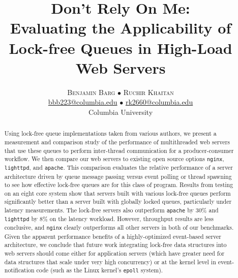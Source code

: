 \documentclass[twoside,10pt]{article}
\title{\vspace{-15mm}%
  \fontsize{24pt}{10pt}\selectfont \textbf{Don't Rely On Me:}\\
  \textbf{Evaluating the Applicability of Lock-free Queues in High-Load Web
    Servers} }
\author{%
  \large
  \textsc{Benjamin Barg $\bullet$ Ruchir Khaitan}\\[2mm]
  \normalsize \href{mailto:bbb2123@columbia.edu}{bbb223@columbia.edu}
    $\bullet$ \href{mailto:rk2660@columbia.edu}{rk2660@columbia.edu}\\
  \normalsize	Columbia University
  \vspace{-5mm} }
\date{}
\begin{document}
\maketitle
\thispagestyle{fancy}

\begin{abstract}
  \noindent Using lock-free queue implementations taken from various
  authors, we present a measurement and comparison study of the
  performance of multithreaded web servers that use these queues to
  perform inter-thread communication for a producer-consumer
  workflow. We then compare our web servers to existing open source
  options \verb+nginx+, \verb+lighttpd+, and \verb+apache+. This
  comparison evaluates the relative performance of a server
  architecture driven by queue message passing versus event polling or
  thread spawning to see how effective lock-free queues are for this
  class of program. Results from testing on an eight core system show
  that servers built with various lock-free queues perform
  significantly better than a server built with globally locked
  queues, particularly under latency measurements. The lock-free
  servers also outperform \verb+apache+ by 30\% and \verb+lighttpd+ by
  8\% on the latency workload. However, throughput results are less
  conclusive, and \verb+nginx+ clearly outperforms all other servers
  in both of our benchmarks. Given the apparent performance benefits
  of a highly-optimized event-based server architecture, we conclude
  that future work integrating lock-free data structures into web
  servers should come either for application servers (which have
  greater need for data structures that scale under very high
  concurrency) or at the kernel level in event-notification code (such
  as the Linux kernel's \verb+epoll+ system).
\end{abstract}
\end{document}
